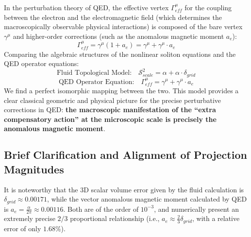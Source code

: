 \documentclass[12pt, a4paper]{article}
\begin{document}
In the perturbation theory of QED, the effective vertex $\Gamma^\mu_{eff}$ for the coupling between the electron and the electromagnetic field (which determines the macroscopically observable physical interactions) is composed of the bare vertex $\gamma^\mu$ and higher-order corrections (such as the anomalous magnetic moment $a_e$):
\begin{equation}
\Gamma^\mu_{eff} = \gamma^\mu \left( 1 + a_e \right) = \gamma^\mu + \gamma^\mu \cdot a_e
\end{equation}
Comparing the algebraic structures of the nonlinear soliton equations and the QED operator equations:
\begin{equation}
\text{Fluid Topological Model:} \quad \mathcal{S}_{scale}^2 = \alpha + \alpha \cdot \delta_{grid}
\end{equation}
\begin{equation}
\text{QED Operator Equation:} \quad \Gamma^\mu_{eff} = \gamma^\mu + \gamma^\mu \cdot a_e
\end{equation}
We find a perfect isomorphic mapping between the two. This model provides a clear classical geometric and physical picture for the precise perturbative corrections in QED: \textbf{the macroscopic manifestation of the ``extra compensatory action'' at the microscopic scale is precisely the anomalous magnetic moment}.

\subsection{Brief Clarification and Alignment of Projection Magnitudes}

It is noteworthy that the 3D scalar volume error given by the fluid calculation is $\delta_{grid} \approx 0.00171$, while the vector anomalous magnetic moment calculated by QED is $a_e = \frac{\alpha}{2\pi} \approx 0.00116$. Both are of the order of $10^{-3}$, and numerically present an extremely precise $2/3$ proportional relationship (i.e., $a_e \approx \frac{2}{3}\delta_{grid}$, with a relative error of only $1.68\%$).
\end{document}
